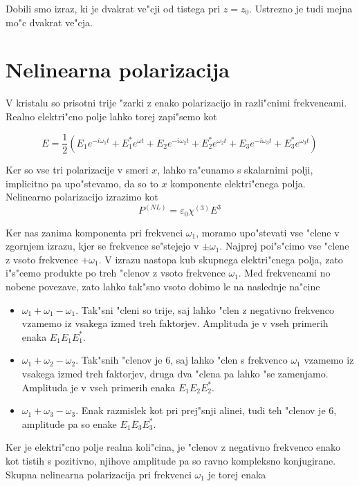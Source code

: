 \documentclass[a4paper,10pt]{article}
\begin{document}
Dobili smo izraz, ki je dvakrat ve"cji od tistega pri $z=z_0$. Ustrezno je tudi mejna mo"c dvakrat ve"cja. 

\section{Nelinearna polarizacija}

V kristalu so prisotni trije "zarki z enako polarizacijo in razli"cnimi frekvencami. Realno elektri"cno polje lahko torej zapi"semo kot

$$E = \frac{1}{2}\left(E_1 e^{-i\omega_1t} + E_1^* e^{\omega t} + E_2 e^{-i\omega_2t} + E_2^* e^{\omega_2 t} + E_3 e^{-i\omega_3t} + E_3^* e^{\omega_3 t}\right)$$

Ker so vse tri polarizacije v smeri $x$, lahko ra"cunamo s skalarnimi polji, implicitno pa upo"stevamo, da so to $x$ komponente elektri"cnega polja. Nelinearno polarizacijo izrazimo kot $$P^{(NL)} = \varepsilon_0 \chi^{(3)} E^3$$

Ker nas zanima komponenta pri frekvenci $\omega_1$, moramo upo"stevati vse "clene v zgornjem izrazu, kjer se frekvence se"stejejo v $\pm \omega_1$. Najprej poi"s"cimo vse "clene z vsoto frekvence $+\omega_1$. V izrazu nastopa kub skupnega elektri"cnega polja, zato i"s"cemo produkte po treh "clenov z vsoto frekvence $\omega_1$. Med frekvencami no nobene povezave, zato lahko tak"sno vsoto dobimo le na naslednje na"cine

\begin{itemize}
 \item $\omega_1 + \omega_1 - \omega_1$. Tak"sni "cleni so trije, saj lahko "clen z negativno frekvenco vzamemo iz vsakega izmed treh faktorjev. Amplituda je v vseh primerih enaka $E_1E_1E_1^*$. 
 \item $\omega_1 + \omega_2 - \omega_2$. Tak"snih "clenov je 6, saj lahko "clen s frekvenco $\omega_1$ vzamemo iz vsakega izmed treh faktorjev, druga dva "clena pa lahko "se zamenjamo. Amplituda je v vseh primerih enaka $E_1E_2E_2^*$. 
 \item $\omega_1 + \omega_3 - \omega_3$. Enak razmislek kot pri prej"snji alinei, tudi teh "clenov je 6, amplitude pa so enake $E_1E_3E_3^*$. 
\end{itemize}

Ker je elektri"cno polje realna koli"cina, je "clenov z negativno frekvenco enako kot tistih s pozitivno, njihove amplitude pa so ravno kompleksno konjugirane. Skupna nelinearna polarizacija pri frekvenci $\omega_1$ je torej enaka
\end{document}
